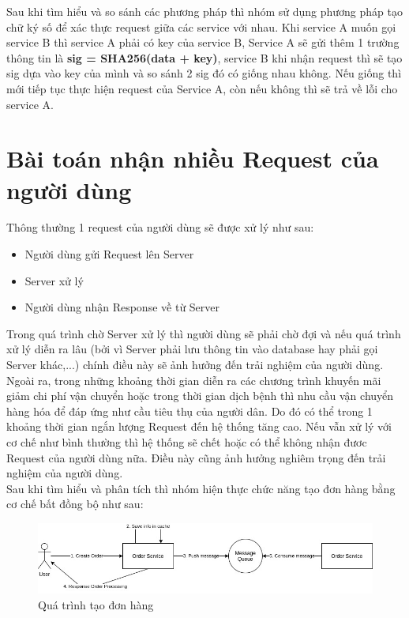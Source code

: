 		Sau khi tìm hiểu và so sánh các phương pháp thì nhóm sử dụng phương pháp tạo chữ ký số để xác thực request giữa các service với nhau. Khi service A muốn gọi service B thì service A phải có key của service B, Service A sẽ gửi thêm 1 trường thông tin là \textbf{sig = SHA256(data + key)}, service B khi nhận request thì sẽ tạo sig dựa vào key của mình và so sánh 2 sig đó có giống nhau không. Nếu giống thì mới tiếp tục thực hiện request của Service A, còn nếu không thì sẽ trả về lỗi cho service A.
		
		
		\section{Bài toán nhận nhiều Request của người dùng}
		Thông thường 1 request của người dùng sẽ được xử lý như sau: 
		
		    \begin{itemize}
                \item Người dùng gửi Request lên Server
                \item Server xử lý
                \item Người dùng nhận Response về từ Server 
            \end{itemize}
        
        Trong quá trình chờ Server xử lý thì người dùng sẽ phải chờ đợi và nếu quá trình xử lý diễn ra lâu (bởi vì Server phải lưu thông tin vào database hay phải gọi Server khác,...) chính điều này sẽ ảnh hưởng đến trải nghiệm của người dùng.\\
        
        Ngoài ra, trong những khoảng thời gian diễn ra các chương trình khuyến mãi giảm chi phí vận chuyển hoặc trong thời gian dịch bệnh thì nhu cầu vận chuyển hàng hóa để đáp ứng như cầu tiêu thụ của người dân. Do đó có thể trong 1 khoảng thời gian ngắn lượng Request đến hệ thống tăng cao. Nếu vẫn xử lý với cơ chế như bình thường thì hệ thống sẽ chết hoặc có thể không nhận đươc Request của người dùng nữa. Điều này cũng ảnh hưởng nghiêm trọng đến trải nghiệm của người dùng.\\
        
        Sau khi tìm hiểu và phân tích thì nhóm hiện thực chức năng tạo đơn hàng bằng cơ chế bất đồng bộ như sau:\\
        
        \begin{figure}[H]
			\includegraphics[width=1\textwidth]{Images/problem1.jpg}
			\centering
			\linebreak
			\caption{Quá trình tạo đơn hàng}
		\end{figure}
        
